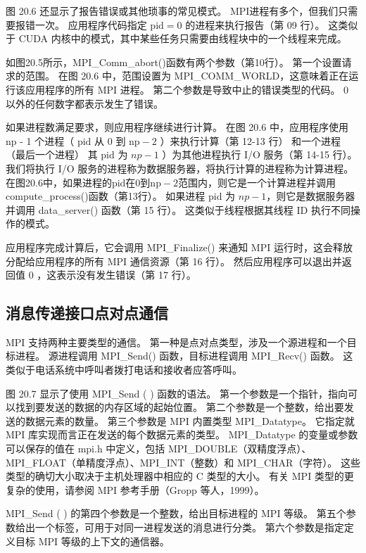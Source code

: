 图 20.6 还显示了报告错误或其他琐事的常见模式。 MPI进程有多个，但我们只需要报错一次。 
应用程序代码指定 $\mathrm{pid}=0$ 的进程来执行报告（第 09 行）。 
这类似于 CUDA 内核中的模式，其中某些任务只需要由线程块中的一个线程来完成。

如图20.5所示，MPI\_Comm\_abort()函数有两个参数（第10行）。 第一个设置请求的范围。 
在图 20.6 中，范围设置为 MPI\_COMM\_WORLD，这意味着正在运行该应用程序的所有 MPI 进程。 
第二个参数是导致中止的错误类型的代码。 0 以外的任何数字都表示发生了错误。

如果进程数满足要求，则应用程序继续进行计算。 
在图 20.6 中，应用程序使用 np - 1 个进程（ $\mathrm{pid}$ 从 0 到 $\mathrm{np}-2$ ）来执行计算（第 12-13 行）
和一个进程（最后一个进程） 其 pid 为 $n p-1$ ）为其他进程执行 I/O 服务（第 14-15 行）。 
我们将执行 I/O 服务的进程称为数据服务器，将执行计算的进程称为计算进程。 
在图20.6中，如果进程的pid在0到$\mathrm{np}-2$范围内，则它是一个计算进程并调用compute\_process()函数（第13行）。 
如果进程 pid 为 $n p-1$，则它是数据服务器并调用 data\_server() 函数（第 15 行）。 
这类似于线程根据其线程 ID 执行不同操作的模式。

应用程序完成计算后，它会调用 MPI\_Finalize() 来通知 MPI 运行时，这会释放分配给应用程序的所有 MPI 通信资源（第 16 行）。 
然后应用程序可以退出并返回值 0 ，这表示没有发生错误（第 17 行）。

\subsection{消息传递接口点对点通信}
MPI 支持两种主要类型的通信。 第一种是点对点类型，涉及一个源进程和一个目标进程。 
源进程调用 MPI\_Send() 函数，目标进程调用 MPI\_Recv() 函数。 这类似于电话系统中呼叫者拨打电话和接收者应答呼叫。

图 20.7 显示了使用 MPI\_Send ( ) 函数的语法。 第一个参数是一个指针，指向可以找到要发送的数据的内存区域的起始位置。 
第二个参数是一个整数，给出要发送的数据元素的数量。 第三个参数是 MPI 内置类型 MPI\_Datatype。 
它指定就 MPI 库实现而言正在发送的每个数据元素的类型。 
MPI\_Datatype 的变量或参数可以保存的值在 mpi.h 中定义，包括 MPI\_DOUBLE（双精度浮点）、
MPI\_FLOAT（单精度浮点）、MPI\_INT（整数）和 MPI\_CHAR（字符）。 
这些类型的确切大小取决于主机处理器中相应的 $\mathrm{C}$ 类型的大小。 
有关 MPI 类型的更复杂的使用，请参阅 MPI 参考手册（Gropp 等人，1999）。

MPI\_Send ( ) 的第四个参数是一个整数，给出目标进程的 MPI 等级。 
第五个参数给出一个标签，可用于对同一进程发送的消息进行分类。 第六个参数是指定定义目标 MPI 等级的上下文的通信器。

